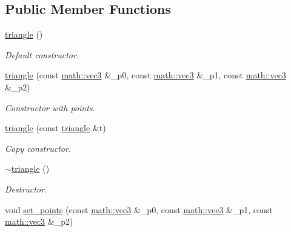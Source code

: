 \subsection*{Public Member Functions}
\begin{DoxyCompactItemize}
\item 
\mbox{\label{classphysim_1_1geometric_1_1triangle_afbd54c03594548533b9d2029287d2f6c}} 
\hyperlink{classphysim_1_1geometric_1_1triangle_afbd54c03594548533b9d2029287d2f6c}{triangle} ()
\begin{DoxyCompactList}\small\item\em Default constructor. \end{DoxyCompactList}\item 
\hyperlink{classphysim_1_1geometric_1_1triangle_a2d57f5d97789fbe518c896983de18822}{triangle} (const \hyperlink{structphysim_1_1math_1_1vec3}{math\+::vec3} \&\+\_\+p0, const \hyperlink{structphysim_1_1math_1_1vec3}{math\+::vec3} \&\+\_\+p1, const \hyperlink{structphysim_1_1math_1_1vec3}{math\+::vec3} \&\+\_\+p2)
\begin{DoxyCompactList}\small\item\em Constructor with points. \end{DoxyCompactList}\item 
\mbox{\label{classphysim_1_1geometric_1_1triangle_aaacf66724ea1354ffc4d51ecae03c8fc}} 
\hyperlink{classphysim_1_1geometric_1_1triangle_aaacf66724ea1354ffc4d51ecae03c8fc}{triangle} (const \hyperlink{classphysim_1_1geometric_1_1triangle}{triangle} \&t)
\begin{DoxyCompactList}\small\item\em Copy constructor. \end{DoxyCompactList}\item 
\mbox{\label{classphysim_1_1geometric_1_1triangle_a4faacc73dc0e42cbf5a4ec4ab8d1cc64}} 
\hyperlink{classphysim_1_1geometric_1_1triangle_a4faacc73dc0e42cbf5a4ec4ab8d1cc64}{$\sim$triangle} ()
\begin{DoxyCompactList}\small\item\em Destructor. \end{DoxyCompactList}\item 
void \hyperlink{classphysim_1_1geometric_1_1triangle_af42f732eecde513426dafd53414518e9}{set\+\_\+points} (const \hyperlink{structphysim_1_1math_1_1vec3}{math\+::vec3} \&\+\_\+p0, const \hyperlink{structphysim_1_1math_1_1vec3}{math\+::vec3} \&\+\_\+p1, const \hyperlink{structphysim_1_1math_1_1vec3}{math\+::vec3} \&\+\_\+p2)

\end{DoxyCompactItemize}
